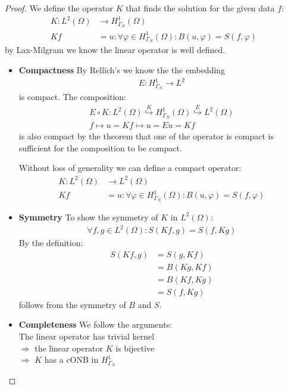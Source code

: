 \begin{proof}
We define the operator $K$ that finds the solution for the given data $f$:
\begin{align*}
	K: L^2(\Omega) &\rightarrow H^1_{\Gamma_N}(\Omega) \\
	Kf &= u :\forall \varphi\in H^1_{\Gamma_N}(\Omega):  B(u, \varphi) = S(f, \varphi) \
\end{align*}
by Lax-Milgram we know the linear operator is well defined.
\begin{itemize}
	\item \textbf{Compactness}
	By Rellich's we know the the embedding
	\begin{align*}
		E: H^1_{\Gamma_N} \rightarrow L^2
	\end{align*}
	is compact. 
	The composition:
	\begin{align*}
		E \circ K: L^2(\Omega) \overset{K}{\hookrightarrow} H^1_{\Gamma_N}(\Omega) \overset{E}{\hookrightarrow} L^2(\Omega)\\
		f \mapsto u = Kf  \mapsto u= Eu = Kf
	\end{align*}
	is also compact by the theorem that one of the operator is compact is sufficient for the composition to be compact.\par
	Without loss of generality we can define a compact operator:
	\begin{align*}
		K: L^2(\Omega) &\rightarrow L^2(\Omega)\\
		Kf &= u: \forall \varphi \in H^1_{\Gamma_N}(\Omega): B(u, \varphi) = S(f, \varphi)
	\end{align*}
	\item \textbf{Symmetry}
	To show the symmetry of $K$ in $L^2(\Omega)$:
	\begin{align*}
		\forall f, g \in L^2(\Omega):  S(Kf, g) = S(f, Kg)
	\end{align*}
	By the definition:
	\begin{align*}
		S(Kf, g) &= S(g, Kf) \\
		&= B(Kg, Kf)\\
		&= B(Kf, Kg)\\
		&= S(f, Kg)
	\end{align*}
	follows from the symmetry of $B$ and $S$. 
	\item \textbf{Completeness}
	We follow the arguments:\\
	The linear operator has trivial kernel\\
	$\Rightarrow$ the linear operator $K$ is bijective\\
	$\Rightarrow$ $K$ has a cONB in $H^1_{\Gamma_N}$\\

\end{itemize}
\end{proof}
